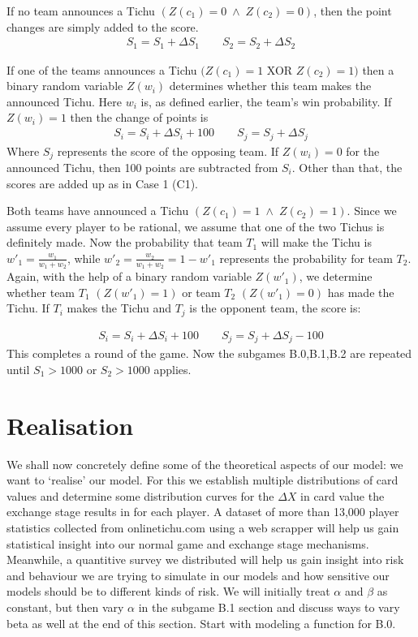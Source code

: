 \begin{axioms}[(C1)]
\item   If no team announces a Tichu $(Z(c_1) = 0\;\land\; Z(c_2) = 0)$, then the point changes are simply added to the score.
\begin{gather*}
S_1 = S_1 + \Delta S_1 \qquad S_2 = S_2 + \Delta S_2
\end{gather*}
\item If one of the teams announces a Tichu $(Z(c_1) = 1$ XOR $Z(c_2) = 1)$ then a binary random variable $Z(w_i)$ determines whether this team makes the announced Tichu. Here $w_i$ is, as defined earlier, the team's win probability. If $Z(w_i) = 1$ then the change of points is
\begin{gather*}
S_i = S_i + \Delta S_i + 100 \qquad S_j = S_j + \Delta S_j
\end{gather*}
Where $S_j$ represents the score of the opposing team. If $Z(w_i) = 0$ for the announced Tichu, then 100 points are subtracted from $S_i$. Other than that, the scores are added up as in Case 1 (C1).
\item Both teams have announced a Tichu $(Z(c_1) = 1\;\land\; Z(c_2) = 1)$. Since we assume every player to be rational, we assume that one of the two Tichus is definitely made. Now the probability that team $T_1$ will make the Tichu is $w'_1 = \frac{w_1}{w_1+w_2}$, while $w'_2 =\frac{w_2}{w_1+w_2} = 1- w'_1$ represents the probability for team $T_2$. Again, with the help of a binary random variable $Z(w'_1)$, we determine whether team $T_1$ $(Z(w'_1) = 1)$ or team $T_2$ $(Z(w'_1) = 0)$ has made the Tichu. If $T_i$ makes the Tichu and $T_j$ is the opponent team, the score is:

\begin{gather*}
S_i = S_i + \Delta S_i + 100 \qquad S_j = S_j + \Delta S_j - 100
\end{gather*}
This completes a round of the game. Now the subgames B.0,B.1,B.2 are repeated until $S_1 > 1000$ or $S_2 > 1000$ applies.
\end{axioms}
\section{Realisation}
We shall now concretely define some of the theoretical aspects of our model: we want to ‘realise’ our model. For this we establish multiple distributions of card values and determine some distribution curves for the $\Delta  X$ in card value the exchange stage results in for each player. A dataset of more than 13,000 player statistics collected from onlinetichu.com using a web scrapper will help us gain statistical insight into our normal game and exchange stage mechanisms. Meanwhile, a quantitive survey we distributed will help us gain insight into risk and behaviour we are trying to simulate in our models and how sensitive our models should be to different kinds of risk. We will initially treat $\alpha$ and $\beta$ as constant, but then vary $\alpha$ in the subgame B.1 section and discuss ways to vary beta as well at the end of this section. Start with modeling a function for B.0.

